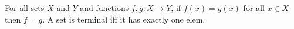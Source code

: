  For all sets $X$ and $Y$ and functions $f, g \colon X \to Y$, if $f(x) = g(x)$ for all $x \in X$ then $f = g$.
 A set is terminal iff it has exactly one elem.
